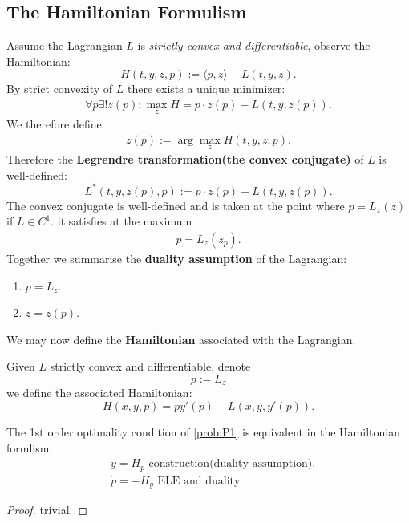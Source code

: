 \subsection{The Hamiltonian Formulism}
Assume the Lagrangian $L$ is \textit{strictly convex and differentiable}, observe the Hamiltonian: 
\begin{equation}
	H(t, y, z, p):= \langle p, z \rangle - L(t, y, z).
\end{equation}
By strict convexity of $L$ there exists a unique minimizer:
\begin{align*}
	\forall p \exists! z(p):  \max_z H = p \cdot z(p) - L(t, y, z(p)). 
\end{align*}
We therefore define
\begin{align*}
	z(p):= \arg\max_z H (t, y, z;p). 
\end{align*}
Therefore the \textbf{Legrendre transformation(the convex conjugate)} of $L$ is well-defined:
\begin{equation}
	L^*(t, y, z(p), p) := p \cdot z(p) - L(t, y, z(p)). 
\end{equation}
The convex conjugate is well-defined and is taken at the point where $p = L_z(z)$ if $L \in C^1$. 
 it satisfies at the maximum
\begin{align*}
	p = L_{z}(z_p).
\end{align*}
Together we summarise the \textbf{duality assumption} of the Lagrangian:
\begin{enumerate}
	\item $p = L_{z}$. 
	\item $z = z(p)$.  
\end{enumerate}
We may now define the \textbf{Hamiltonian} associated with the Lagrangian.
\begin{definition}
	Given $L$ strictly convex and differentiable, denote
	\begin{equation}
		p := L_z
	\end{equation} we define the associated Hamiltonian:
	\begin{equation}
		H(x, y, p) = p y'(p) - L(x, y, y'(p)). 
	\end{equation}
\end{definition}

\begin{theorem}
	The 1st order optimality condition of \eqref{prob:P1} is equivalent in the Hamiltonian formlism:
	\begin{align*}
		& \dot{y} = H_p \text{ construction(duality assumption).}\\
		& \dot{p} = - H_y \text{ ELE and duality}
	\end{align*}
\end{theorem}
\begin{proof}
	trivial.
\end{proof}



